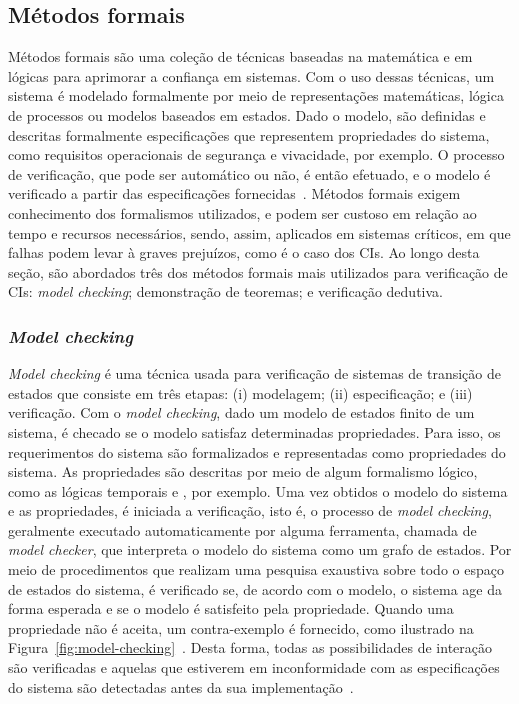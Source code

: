
\subsection{Métodos formais} \label{tex:fund:metodos-formais}

Métodos formais são uma coleção de técnicas baseadas na matemática e em lógicas para aprimorar a confiança em sistemas. Com o uso dessas técnicas, um sistema é modelado formalmente por meio de representações matemáticas, lógica de processos ou modelos baseados em estados. Dado o modelo, são definidas e descritas formalmente especificações que representem propriedades do sistema, como requisitos operacionais de segurança e vivacidade, por exemplo. O processo de verificação, que pode ser automático ou não, é então efetuado, e o modelo é verificado a partir das especificações fornecidas~\cite{peled2019formal-methods}. Métodos formais exigem conhecimento dos formalismos utilizados, e podem ser custoso em relação ao tempo e recursos necessários, sendo, assim, aplicados em sistemas críticos, em que falhas podem levar à graves prejuízos, como é o caso dos CIs. Ao longo desta seção, são abordados três dos métodos formais mais utilizados para verificação de CIs: \textit{model checking}; demonstração de teoremas; e verificação dedutiva.

\subsubsection*{\textbf{\textit{Model checking}}}

\textit{Model checking} é uma técnica usada para verificação de sistemas de transição de estados que consiste em três etapas: (i) modelagem; (ii) especificação; e (iii) verificação. Com o \textit{model checking}, dado um modelo de estados finito de um sistema, é checado se o modelo satisfaz determinadas propriedades. Para isso, os requerimentos do sistema são formalizados e representadas como propriedades do sistema. As propriedades são descritas por meio de algum formalismo lógico, como as lógicas temporais  e , por exemplo. Uma vez obtidos o modelo do sistema e as propriedades, é iniciada a verificação, isto é, o processo de \textit{model checking}, geralmente executado automaticamente por alguma ferramenta, chamada de \textit{model checker}, que interpreta o modelo do sistema como um grafo de estados. Por meio de procedimentos que realizam uma pesquisa exaustiva sobre todo o espaço de
estados do sistema, é verificado se, de acordo com o modelo, o sistema age da forma esperada e se o modelo é satisfeito pela propriedade. Quando uma propriedade não é aceita, um contra-exemplo é fornecido, como ilustrado na Figura~\ref{fig:model-checking}~\cite{clarke2018model}. Desta forma, todas as possibilidades de interação são verificadas e aquelas que estiverem em inconformidade com as especificações do sistema são detectadas antes da sua implementação~\cite{peled2019formal-methods}.

